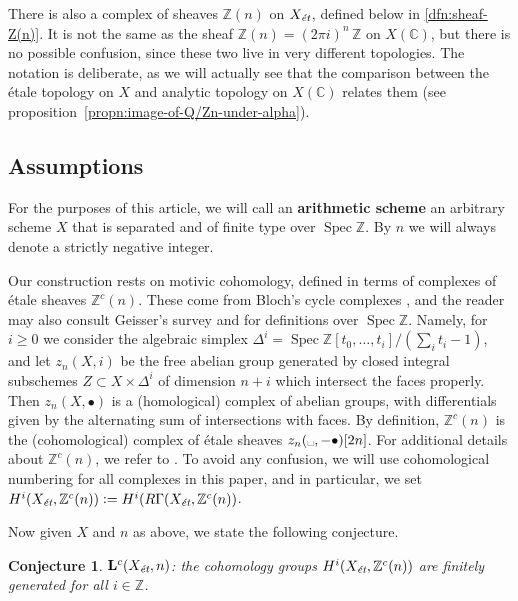 \documentclass[leqno,12pt]{article}
\theoremstyle{plain}
\newtheorem{conjecture}[theorem]{\indent\sc Conjecture}
\theoremstyle{definition}
\DeclareMathOperator{\Spec}{Spec}
\newcommand{\CC}{\mathbb{C}}
\newcommand{\ZZ}{\mathbb{Z}}
\newcommand{\dfn}{\mathrel{\mathop:}=}
\newcommand{\et}{\text{\it \'{e}t}}
\begin{document}
There is also a complex of sheaves $\ZZ (n)$ on $X_\et$, defined below in
\ref{dfn:sheaf-Z(n)}. It is not the same as the sheaf
$\ZZ (n) = (2\pi i)^n\,\ZZ$ on $X (\CC)$, but there is no possible confusion,
since these two live in very different topologies. The notation is deliberate,
as we will actually see that the comparison between the \'{e}tale topology on $X$
and analytic topology on $X (\CC)$ relates them
(see proposition~\ref{propn:image-of-Q/Zn-under-alpha}).

\subsection*{Assumptions}

For the purposes of this article, we will call an \textbf{arithmetic scheme} an
arbitrary scheme $X$ that is separated and of finite type over $\Spec \ZZ$.
By $n$ we will always denote a strictly negative integer.

Our construction rests on motivic cohomology, defined in terms of complexes
of \'{e}tale sheaves $\ZZ^c (n)$. These come from Bloch's cycle complexes
\cite{Bloch-1986}, and the reader may also consult Geisser's survey
\cite{Geisser-2005} and \cite{Geisser-2004-Dedekind} for definitions over
$\Spec \ZZ$. Namely, for $i \ge 0$ we consider the algebraic simplex
$\Delta^i = \Spec \ZZ[t_0,\ldots,t_i]/(\sum_i t_i - 1)$, and let $z_n (X,i)$ be
the free abelian group generated by closed integral subschemes
$Z \subset X \times \Delta^i$ of dimension $n + i$ which intersect the faces
properly. Then $z_n (X, \bullet)$ is a (homological) complex of abelian groups,
with differentials given by the alternating sum of intersections with faces.
By definition, $\ZZ^c (n)$ is the (cohomological) complex of \'{e}tale sheaves
$z_n (\text{\textvisiblespace}, -\bullet) [2n]$. For additional details about
$\ZZ^c (n)$, we refer to \cite[\S 2]{Geisser-2010}. To avoid any confusion,
we will use cohomological numbering for all complexes in this paper, and in
particular, we set $H^i (X_\et, \ZZ^c(n)) \dfn H^i (R\Gamma (X_\et, \ZZ^c(n))$.

\vspace{1em}

Now given $X$ and $n$ as above, we state the following conjecture.

\begin{conjecture}
  $\mathbf{L}^c (X_\et,n)$: the cohomology groups $H^i (X_\et, \ZZ^c (n))$ are
  finitely generated for all $i \in \ZZ$.
\end{conjecture}
\end{document}

